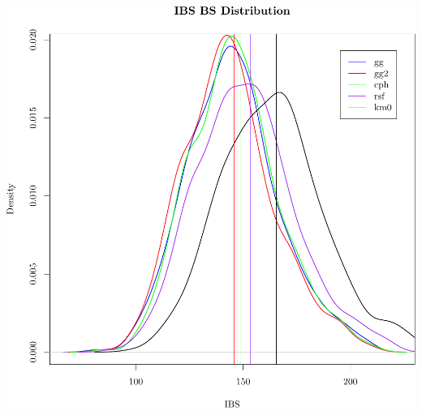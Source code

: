 \documentclass{article}\usepackage[]{graphicx}\usepackage[]{color}
\makeatletter
\def\maxwidth{ %
  \ifdim\Gin@nat@width>\linewidth
    \linewidth
  \else
    \Gin@nat@width
  \fi
}
\newenvironment{knitrout}{}{} %
\makeatother
\begin{document}
\begin{knitrout}
{\centering \includegraphics[width=\maxwidth]{figure/05-model-selection-ibs-2} 

}



\end{knitrout}
\end{document}
